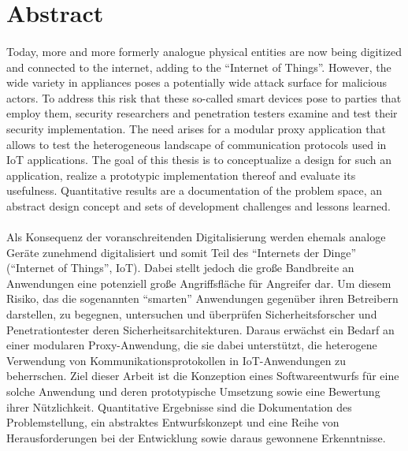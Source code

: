 \chapter*{Abstract}
\subsubsection*{\hsmatitelen}
Today, more and more formerly analogue physical entities are now being digitized and connected to the internet, adding to the \enquote{Internet of Things}. However, the wide variety in appliances poses a potentially wide attack surface for malicious actors. To address this risk that these so-called smart devices pose to parties that employ them, security researchers and penetration testers examine and test their security implementation. The need arises for a modular proxy application that allows to test the heterogeneous landscape of communication protocols used in IoT applications. The goal of this thesis is to conceptualize a design for such an application, realize a prototypic implementation thereof and evaluate its usefulness. Quantitative results are a documentation of the problem space, an abstract design concept and sets of development challenges and lessons learned. 

\subsubsection*{\hsmatitelde}
Als Konsequenz der voranschreitenden Digitalisierung werden ehemals analoge Geräte zunehmend digitalisiert und somit Teil des \enquote{Internets der Dinge} (\enquote{Internet of Things}, IoT). Dabei stellt jedoch die große Bandbreite an Anwendungen eine potenziell große Angriffsfläche für Angreifer dar. Um diesem Risiko, das die sogenannten \enquote{smarten} Anwendungen gegenüber ihren Betreibern darstellen, zu begegnen, untersuchen und überprüfen Sicherheitsforscher und Penetrationtester deren Sicherheitsarchitekturen. Daraus erwächst ein Bedarf an einer modularen Proxy-Anwendung, die sie dabei unterstützt, die heterogene Verwendung von Kommunikationsprotokollen in IoT-Anwendungen zu beherrschen. Ziel dieser Arbeit ist die Konzeption eines Softwareentwurfs für eine solche Anwendung und deren prototypische Umsetzung sowie eine Bewertung ihrer Nützlichkeit. Quantitative Ergebnisse sind die Dokumentation des Problemstellung, ein abstraktes Entwurfskonzept und eine Reihe von Herausforderungen bei der Entwicklung sowie daraus gewonnene Erkenntnisse.